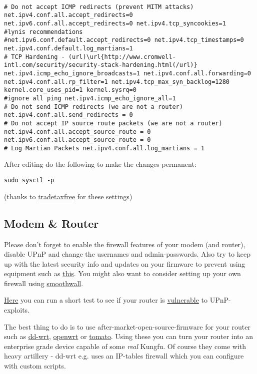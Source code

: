 \documentclass{article}
\begin{document}
\begin{lstlisting}

# Do not accept ICMP redirects (prevent MITM attacks) net.ipv4.conf.all.accept_redirects=0 net.ipv6.conf.all.accept_redirects=0 net.ipv4.tcp_syncookies=1 
#lynis recommendations 
#net.ipv6.conf.default.accept_redirects=0 net.ipv4.tcp_timestamps=0 net.ipv4.conf.default.log_martians=1 
# TCP Hardening - (url)\url{http://www.cromwell-intl.com/security/security-stack-hardening.html(/url)} net.ipv4.icmp_echo_ignore_broadcasts=1 net.ipv4.conf.all.forwarding=0 net.ipv4.conf.all.rp_filter=1 net.ipv4.tcp_max_syn_backlog=1280 kernel.core_uses_pid=1 kernel.sysrq=0 
#ignore all ping net.ipv4.icmp_echo_ignore_all=1 
# Do not send ICMP redirects (we are not a router) net.ipv4.conf.all.send_redirects = 0 
# Do not accept IP source route packets (we are not a router) net.ipv4.conf.all.accept_source_route = 0 net.ipv6.conf.all.accept_source_route = 0 
# Log Martian Packets net.ipv4.conf.all.log_martians = 1
\end{lstlisting}



 After editing do the following to make the changes permanent:
\begin{lstlisting}
sudo sysctl -p
\end{lstlisting}



 (thanks to \href{http://crunchbang.org/forums/viewtopic.php?pid=197357#p197357}{tradetaxfree} for these settings)
\subsection{Modem \& Router}


 Please don't forget to enable the firewall features of your modem (and router), disable UPnP and change the usernames and admin-passwords. Also try to keep up with the latest security info and updates on your firmware to prevent using equipment such as \href{http://www.exploit-db.com/exploits/24453/}{this}. You might also want to consider setting up your own firewall using \href{http://youtu.be/2w28gn5nDlM}{smoothwall}.


 \href{http://upnp-check.rapid7.com/}{Here} you can run a short test to see if your router is \href{https://community.rapid7.com/docs/DOC-2150vulnerable}{vulnerable} to UPnP-exploits.


 The best thing to do is to use after-market-open-source-firmware for your router such as \href{http://www.dd-wrt.com/site/index}{dd-wrt}, \href{https://openwrt.org/}{openwrt} or \href{http://www.polarcloud.com/tomato}{tomato}. Using these you can turn your router into an enterprise grade device capable of some \emph{real} Kungfu. Of course they come with heavy artillery - dd-wrt e.g. uses an IP-tables firewall which you can configure with custom scripts. 
\end{document}

